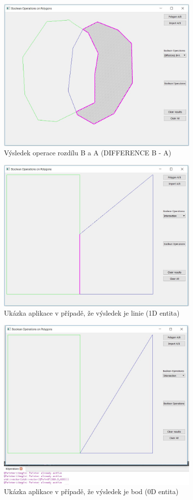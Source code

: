 \documentclass[a4paper, 12pt]{article}
\begin{document}
\begin{figure}[h!]
\centering
\includegraphics[width=10cm]{pictures/diffBA.jpg}
\caption{Výsledek operace rozdílu B a A (DIFFERENCE B - A)}
\end{figure}

\begin{figure}[h!]
\centering
\includegraphics[width=10cm]{pictures/1D.jpg}
\caption{Ukázka aplikace v případě, že výsledek je linie (1D entita)}
\end{figure}

\begin{figure}[h!]
\centering
\includegraphics[width=10cm]{pictures/0D.jpg}
\caption{Ukázka aplikace v případě, že výsledek je bod (0D entita)}
\end{figure}
\end{document}

